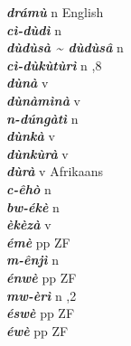\begin{multicols}{2}
{{\bfseries\itshape drámù}} \relax  n   \relax  {} \relax  English \relax  \\
{{\bfseries\itshape cì-dùdì}} \relax  n   \relax  {} \relax   \relax  \\
{{\bfseries\itshape dùdùsà {\textasciitilde} dùdùsâ}} \relax  n   \relax  {} \relax   \relax  \\
{{\bfseries\itshape cì-dùkùtùrì}} \relax  n  ,8  \relax   \relax  \\
{{\bfseries\itshape dùnà}} \relax  v  \relax   \relax  {} \relax   \relax  \\
{{\bfseries\itshape dùnàmìnà}} \relax  v  \relax  {} \relax   \relax  \\
{{\bfseries\itshape n-dúngàtì}} \relax  n   \relax  {} \relax   \relax  \\
{{\bfseries\itshape dùnkà}} \relax  v  \relax   \relax  {} \relax   \relax  \\
{{\bfseries\itshape dùnkùrà}} \relax  v  \relax   \relax  {} \relax   \relax  \\
{{\bfseries\itshape dùrà}} \relax  v  \relax   \relax  {} \relax  Afrikaans \relax  \\
{{\bfseries\itshape c-êhò}} \relax  n   \relax  {} \relax   \relax  \\
{{\bfseries\itshape bw-ékè}} \relax  n   \relax  {} \relax   \relax  \\
{{\bfseries\itshape èkèzà}} \relax  v  \relax   \relax  {} \relax   \relax  \\
{{\bfseries\itshape émè}} \relax  pp  \relax   \relax  {} \relax  ZF \relax  \\
{{\bfseries\itshape m-ênjì}} \relax  n   \relax  {} \relax   \relax  \\
{{\bfseries\itshape énwè}} \relax  pp  \relax   \relax  {} \relax  ZF \relax  \\
{{\bfseries\itshape mw-èrì}} \relax  n  ,2 \relax  {} \relax   \relax  \\
{{\bfseries\itshape éswè}} \relax  pp  \relax   \relax  {} \relax  ZF \relax  \\
{{\bfseries\itshape éwè}} \relax  pp  \relax   \relax  {} \relax  ZF \relax  \\

\end{multicols}
